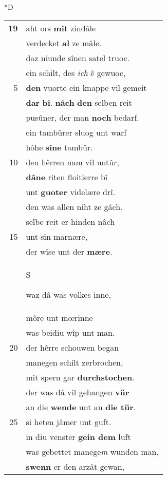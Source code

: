 \documentclass[8pt,a4paper,notitlepage]{article}
\begin{document}
\begin{table}[ht]
\begin{minipage}[t]{0.5\linewidth}
\small
\begin{center}*D
\end{center}
\begin{tabular}{rl}
\textbf{19} & aht ors \textbf{mit} zindâle\\ 
 & verdecket \textbf{al} ze mâle.\\ 
 & daz niunde sînen satel truoc.\\ 
 & ein schilt, des \textit{ich} ê gewuoc,\\ 
5 & \textbf{den} vuorte ein knappe vil gemeit\\ 
 & \textbf{dar} \textbf{bî}. \textbf{nâch} \textbf{den} selben reit\\ 
 & pusûner, der man \textbf{noch} bedarf.\\ 
 & ein tambûrer sluog unt warf\\ 
 & hôhe \textbf{sîne} tambûr.\\ 
10 & den hêrren nam vil untûr,\\ 
 & \textbf{dâ}\textbf{ne} riten floitierre bî\\ 
 & unt \textbf{guoter} videlære drî.\\ 
 & den was allen niht ze gâch.\\ 
 & selbe reit er hinden nâch\\ 
15 & unt sîn marnære,\\ 
 & der wîse unt der \textbf{mære}.\\ 
 & \begin{large}S\end{large}waz dâ was volkes inne,\\ 
 & môre unt mœrinne\\ 
 & was beidiu wîp unt man.\\ 
20 & der hêrre schouwen began\\ 
 & manegen schilt zerbrochen,\\ 
 & mit spern gar \textbf{durchstochen}.\\ 
 & der was dâ vil gehangen \textbf{vür}\\ 
 & an die \textbf{wende} unt an \textbf{die tür}.\\ 
25 & si heten jâmer unt guft.\\ 
 & in diu venster \textbf{gein dem} luft\\ 
 & was gebettet manege\textit{m} wunden man,\\ 
 & \textbf{swenn} er den arzât gewan,\\ 

\end{tabular}
\end{minipage}
\end{table}
\end{document}
